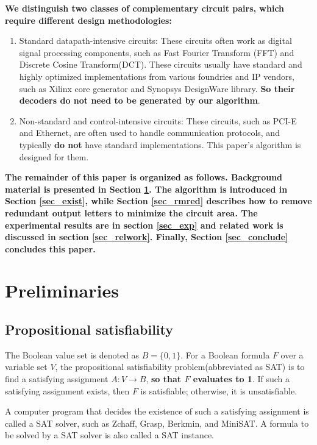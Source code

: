 \documentclass[journal]{IEEEtran}
\begin{document}
\textbf{We distinguish two classes of complementary circuit pairs,
  which require different design methodologies:}
\begin{enumerate}
  \item Standard datapath-intensive circuits:
  These circuits often work as digital signal processing components, such as
      Fast Fourier Transform (FFT) and
      Discrete Cosine Transform(DCT).
      These circuits usually have standard and highly optimized implementations from various foundries and IP vendors,
      such as Xilinx core generator\cite{CoreGen} and Synopsys DesignWare library\cite{DesignWare}.
      \textbf{So their decoders do not need to be generated by our algorithm}.
  \item Non-standard and control-intensive circuits:
  These circuits,
  such as PCI-E\cite{PCIESPEC} and Ethernet\cite{IEEE80232002},
  are often used to handle communication protocols,
  and typically \textbf{do not} have standard implementations.
      This paper's algorithm is designed for them.
\end{enumerate}


\textbf{The remainder of this paper is organized as follows.
Background material is presented in Section \ref{sec_prem}.
The algorithm is introduced in Section \ref{sec_exist},
while Section \ref{sec_rmred} describes how to remove redundant output letters to minimize the circuit area.
The experimental results are in section \ref{sec_exp} and related work is discussed in section \ref{sec_relwork}.
Finally,
Section \ref{sec_conclude} concludes this paper.}

\section{Preliminaries}\label{sec_prem}


\subsection{Propositional satisfiability}\label{subsec_SAT}
The Boolean value set is denoted as $B=\{0,1\}$.
For a Boolean formula $F$ over a variable set $V$,
the propositional satisfiability problem(abbreviated as SAT) is to find a satisfying assignment $A:V\to B$,
\textbf{so that $F$ evaluates to 1}.
If such a satisfying assignment exists, then $F$ is satisfiable;
otherwise,
it is unsatisfiable.

A computer program that decides the existence of such a satisfying assignment is called a SAT solver,
such as Zchaff\cite{CHAFF}, Grasp\cite{grasp}, Berkmin\cite{BERKMIN},
and MiniSAT\cite{EXTSAT}.
A formula to be solved by a SAT solver is also called a SAT instance.
\end{document}

